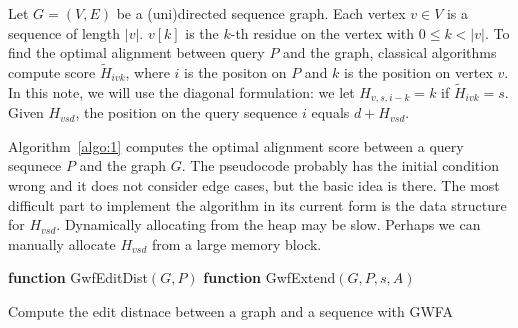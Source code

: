 \documentclass[10pt]{article}
\begin{document}
Let $G=(V,E)$ be a (uni)directed sequence graph.
Each vertex $v\in V$ is a sequence of length $|v|$.
$v[k]$ is the $k$-th residue on the vertex with $0\le k<|v|$.
To find the optimal alignment between query $P$ and the graph,
classical algorithms compute score $\tilde{H}_{ivk}$,
where $i$ is the positon on $P$ and $k$ is the position on vertex $v$.
In this note, we will use the diagonal formulation: we let $H_{v,s,i-k}=k$ if $\tilde{H}_{ivk}=s$.
Given $H_{vsd}$, the position on the query sequence $i$ equals $d+H_{vsd}$.

Algorithm~\ref{algo:1} computes the optimal alignment score between a query sequnece $P$ and the graph $G$.
The pseudocode probably has the initial condition wrong and it does not consider edge cases,
but the basic idea is there.
The most difficult part to implement the algorithm in its current form is the data structure for $H_{vsd}$.
Dynamically allocating from the heap may be slow.
Perhaps we can manually allocate $H_{vsd}$ from a large memory block.

\begin{algorithm}[!hb]
\DontPrintSemicolon
\footnotesize
{}
\BlankLine
\textbf{function} {\sc GwfEditDist}$(G,P)$
\textbf{function} {\sc GwfExtend}$(G,P,s,A)$
\caption{Compute the edit distnace between a graph and a sequence with GWFA}\label{algo:1}
\end{algorithm}
\end{document}

